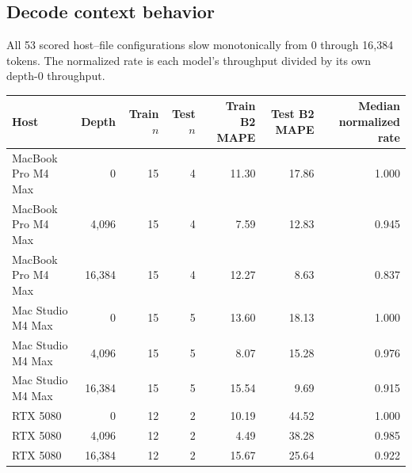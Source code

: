 \documentclass[10pt]{article}
\begin{document}
\subsection{Decode context behavior}
All 53 scored host--file configurations slow monotonically from 0 through 16,384 tokens. The normalized rate is each model's throughput divided by its own depth-0 throughput.
\begin{center}
\small
\begin{tabular}{lrrrrrr}
\toprule
Host & Depth & Train $n$ & Test $n$ & Train B2 MAPE & Test B2 MAPE & Median normalized rate\\
\midrule
MacBook Pro M4 Max & 0 & 15 & 4 & 11.30 & 17.86 & 1.000 \\
MacBook Pro M4 Max & 4,096 & 15 & 4 & 7.59 & 12.83 & 0.945 \\
MacBook Pro M4 Max & 16,384 & 15 & 4 & 12.27 & 8.63 & 0.837 \\
Mac Studio M4 Max & 0 & 15 & 5 & 13.60 & 18.13 & 1.000 \\
Mac Studio M4 Max & 4,096 & 15 & 5 & 8.07 & 15.28 & 0.976 \\
Mac Studio M4 Max & 16,384 & 15 & 5 & 15.54 & 9.69 & 0.915 \\
RTX 5080 & 0 & 12 & 2 & 10.19 & 44.52 & 1.000 \\
RTX 5080 & 4,096 & 12 & 2 & 4.49 & 38.28 & 0.985 \\
RTX 5080 & 16,384 & 12 & 2 & 15.67 & 25.64 & 0.922 \\
\bottomrule
\end{tabular}
\end{center}
\end{document}
